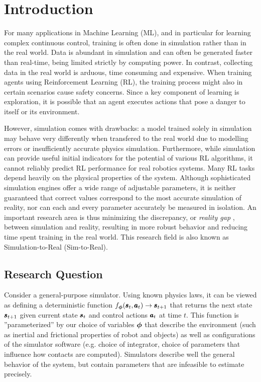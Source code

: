\chapter{Introduction}
\label{introduction}
For many applications in Machine Learning (ML), and in particular for learning complex continuous control, training is often done in simulation rather than in the real world. Data is abundant in simulation and can often be generated faster than real-time, being limited strictly by computing power. In contrast, collecting data in the real world is arduous, time consuming and expensive. When training agents using Reinforcement Learning (RL), the training process might also in certain scenarios cause safety concerns. Since a key component of learning is exploration, it is possible that an agent executes actions that pose a danger to itself or its environment.

However, simulation comes with drawbacks: a model trained solely in simulation may behave very differently when transfered to the real world due to modelling errors or insufficiently accurate physics simulation. Furthermore, while simulation can provide useful initial indicators for the potential of various RL algorithms, it cannot reliably predict RL performance for real robotics systems. Many RL tasks depend heavily on the physical properties of the system. Although sophisticated simulation engines offer a wide range of adjustable parameters, it is neither guaranteed that correct values correspond to the most accurate simulation of reality, nor can each and every parameter accurately be measured in isolation. An important research area is thus minimizing the discrepancy, or \emph{reality gap} \parencite{Jakobi1995NoiseAT}, between simulation and reality, resulting in more robust behavior and reducing time spent training in the real world. This research field is also known as Simulation-to-Real (Sim-to-Real).

\section{Research Question}

Consider a general-purpose simulator. Using known physics laws, it can be viewed as defining a deterministic function $f_{\boldsymbol{\phi}}(\pmb{s}_t, \pmb{a}_t) \rightarrow \pmb{s}_{t+1}$ that returns the next state $\pmb{s}_{t+1}$ given current state $\pmb{s}_t$ and control actions $\pmb{a}_t$ at time $t$. This function is ''parameterized'' by our choice of variables $\boldsymbol{\phi}$ that describe the environment (such as inertial and frictional properties of robot and objects) as well as configurations of the simulator software (e.g. choice of integrator, choice of parameters that influence how contacts are computed). Simulators describe well the general behavior of the system, but contain parameters that are infeasible to estimate precisely.%

